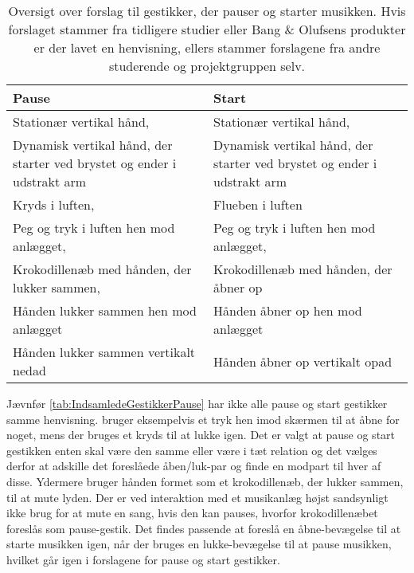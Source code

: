\begin{table}[H]
	\centering
	\begin{tabular}{| p{6cm} | p{6cm} | }
		\hline
		\textbf{Pause} & \textbf{Start} \\ \hline
		Stationær vertikal hånd, \parencite[s. 166]{PDF:ComparingInputModalities} & Stationær vertikal hånd, \parencite[s. 166]{PDF:ComparingInputModalities} \\ \hline
		Dynamisk vertikal hånd, der starter ved brystet og ender i udstrakt arm  & Dynamisk vertikal hånd, der starter ved brystet og ender i udstrakt arm  \\ \hline
		Kryds i luften, \parencite[s. 48]{PDF:UserDefinedGesturesTV} & Flueben i luften \\ \hline
		Peg og tryk i luften hen mod anlægget, \parencite{WEB:BeosoundMoment, WEB:Beosound2} & Peg og tryk i luften hen mod anlægget, \parencite[s. 48]{WEB:BeosoundMoment, WEB:Beosound2, PDF:UserDefinedGesturesTV} \\ \hline
		Krokodillenæb med hånden, der lukker sammen, \parencite[s. 48]{PDF:UserDefinedGesturesTV} & Krokodillenæb med hånden, der åbner op \\ \hline
		Hånden lukker sammen hen mod anlægget & Hånden åbner op hen mod anlægget \\ \hline
		Hånden lukker sammen vertikalt nedad & Hånden åbner op vertikalt opad  \\ \hline
	\end{tabular}
	\caption{Oversigt over forslag til gestikker, der pauser og starter musikken. Hvis forslaget stammer fra tidligere studier eller Bang $\&$ Olufsens produkter er der lavet en henvisning, ellers stammer forslagene fra andre studerende og projektgruppen selv.}
	\label{tab:IndsamledeGestikkerPause}
\end{table}
\noindent

Jævnfør \autoref{tab:IndsamledeGestikkerPause} har ikke alle pause og start gestikker samme henvisning. \textcite[s. 48]{PDF:UserDefinedGesturesTV} bruger eksempelvis et tryk hen imod skærmen til at åbne for noget, mens der bruges et kryds til at lukke igen. Det er valgt at pause og start gestikken enten skal være den samme eller være i tæt relation og det vælges derfor at adskille det foreslåede åben/luk-par og finde en modpart til hver af disse. Ydermere bruger \textcite[s. 48]{PDF:UserDefinedGesturesTV} hånden formet som et krokodillenæb, der lukker sammen, til at mute lyden. Der er ved interaktion med et musikanlæg højst sandsynligt ikke brug for at mute en sang, hvis den kan pauses, hvorfor krokodillenæbet foreslås som pause-gestik. Det findes passende at foreslå en åbne-bevægelse til at starte musikken igen, når der bruges en lukke-bevægelse til at pause musikken, hvilket går igen i forslagene for pause og start gestikker.

